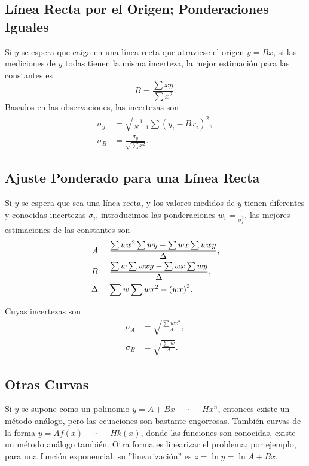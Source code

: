 \subsection{Línea Recta por el Origen; Ponderaciones Iguales}
Si $y$ se espera que caiga en una línea recta que atraviese el origen $y = Bx$, si las mediciones de $y$ todas tienen la misma incerteza, la mejor estimación para las constantes es
	\begin{equation}
		B = \frac{\sum xy}{\sum x^2}.
	\end{equation}
Basados en las observaciones, las incertezas son
	\begin{align}
		\sigma _y &= \sqrt{\frac{1}{N - 1} \sum (y_i - Bx_i)^2}, \\
		\sigma _B &= \frac{\sigma _y}{\sqrt{\sum x^2}}.
	\end{align}

\subsection{Ajuste Ponderado para una Línea Recta}
Si $y$ se espera que sea una línea recta, y los valores medidos de $y$ tienen diferentes y conocidas incertezas $\sigma _i$, introducimos las ponderaciones $w_i = \frac{1}{\sigma _i ^2}$, las mejores estimaciones de las constantes son
	\begin{align}
		A &= \frac{\sum wx^2 \sum wy - \sum wx \sum wxy}{\Delta}, \\
		B &= \frac{\sum w \sum wxy - \sum wx \sum wy}{\Delta}, \\
		\Delta &= \sum w \sum wx^2 - \qty(wx)^2.
	\end{align}

Cuyas incertezas son
	\begin{align}
		\sigma _A &= \sqrt{\frac{\sum wx^2}{\Delta}}, \\
		\sigma _B &= \sqrt{\frac{\sum w}{\Delta}}.
	\end{align}

\subsection{Otras Curvas}
Si $y$ se supone como un polinomio $y = A + Bx + \cdots + Hx^n$, entonces existe un método análogo, pero las ecuaciones son bastante engorrosas. También curvas de la forma $y = A f(x) + \cdots + Hk(x)$, donde las funciones son conocidas, existe un método análogo también. Otra forma es linearizar el problema; por ejemplo, para una función exponencial, su ''linearización'' es $z = \ln{y} = \ln{A} + Bx$.

































